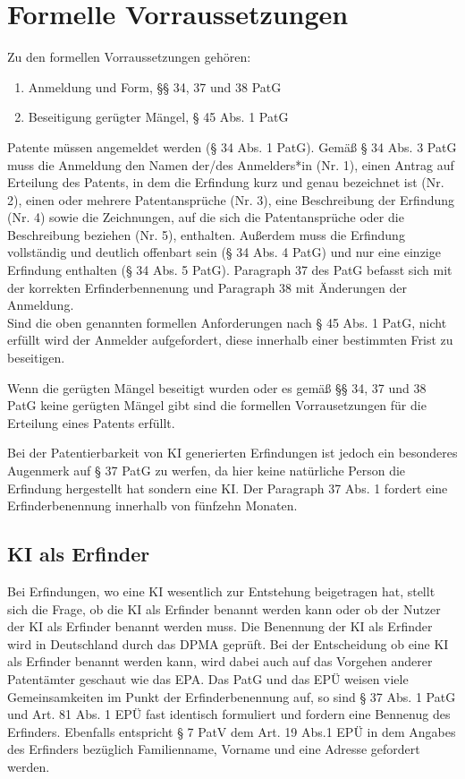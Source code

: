 \section{Formelle Vorraussetzungen}

Zu den formellen Vorraussetzungen gehören:
\begin{enumerate}
    \item Anmeldung und Form, §§ 34, 37 und 38 PatG 
    \vspace{-0.11in} 
    \item Beseitigung gerügter Mängel, § 45 Abs. 1 PatG
\end{enumerate}

Patente müssen angemeldet werden (§ 34 Abs. 1 PatG). 
Gemäß § 34 Abs. 3 PatG muss die Anmeldung den Namen der/des Anmelders*in 
(Nr. 1), einen Antrag auf Erteilung des Patents, 
in dem die Erfindung kurz und genau bezeichnet ist (Nr. 2), 
einen oder mehrere Patentansprüche (Nr. 3), 
eine Beschreibung der Erfindung (Nr. 4) sowie die Zeichnungen, 
auf die sich die Patentansprüche oder die Beschreibung beziehen (Nr. 5), 
enthalten. 
Außerdem muss die Erfindung vollständig und deutlich offenbart sein (§ 34 Abs. 4 PatG) 
und nur eine einzige Erfindung enthalten (§ 34 Abs. 5 PatG). 
Paragraph 37 des PatG befasst sich mit der korrekten Erfinderbennenung 
und Paragraph 38 mit Änderungen der Anmeldung. 
\\

Sind die oben genannten formellen Anforderungen nach § 45 Abs. 1 PatG, 
nicht erfüllt wird der Anmelder aufgefordert, 
diese innerhalb einer bestimmten Frist zu beseitigen.

Wenn die gerügten Mängel beseitigt wurden 
oder es gemäß §§ 34, 37 und 38 PatG keine gerügten Mängel gibt 
sind die formellen Vorrausetzungen für die Erteilung eines Patents erfüllt.

Bei der Patentierbarkeit von KI generierten Erfindungen ist jedoch 
ein besonderes Augenmerk
auf § 37 PatG zu werfen, da hier keine natürliche Person
die Erfindung hergestellt hat sondern eine KI. 
Der Paragraph 37 Abs. 1 fordert eine Erfinderbenennung
innerhalb von fünfzehn Monaten.

\subsection{KI als Erfinder}
Bei Erfindungen, wo eine KI wesentlich
zur Entstehung beigetragen hat, stellt sich die Frage,
ob die KI als Erfinder benannt werden kann oder
ob der Nutzer der KI als Erfinder benannt werden muss.
Die Benennung der KI als Erfinder wird in Deutschland 
durch das DPMA geprüft. Bei der Entscheidung
ob eine KI als Erfinder benannt werden kann,
wird dabei auch auf das Vorgehen anderer 
Patentämter geschaut wie das EPA. 
Das PatG und das EPÜ weisen viele Gemeinsamkeiten
im Punkt der Erfinderbenennung auf, so sind 
§ 37 Abs. 1 PatG und 
Art. 81 Abs. 1 EPÜ fast identisch formuliert und 
fordern eine Bennenug des Erfinders.
Ebenfalls entspricht § 7 PatV dem 
Art. 19 Abs.1 EPÜ in dem Angabes des Erfinders
bezüglich Familienname, Vorname und eine Adresse gefordert 
werden. 

